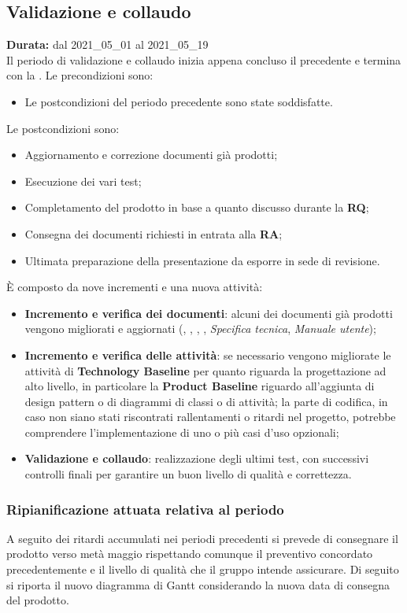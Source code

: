 \subsection{Validazione e collaudo}
\label{validazione_e_collaudo}
\textbf{Durata:} dal 2021\_05\_01 al 2021\_05\_19\\
Il periodo di validazione e collaudo inizia appena concluso il precedente e termina con la .
Le precondizioni sono:
\begin{itemize}
    \item Le postcondizioni del periodo precedente sono state soddisfatte.
\end{itemize}
Le postcondizioni sono:
\begin{itemize}
    \item Aggiornamento e correzione documenti già prodotti;
    \item Esecuzione dei vari test;
    \item Completamento del prodotto in base a quanto discusso durante la \textbf{RQ};
    \item Consegna dei documenti richiesti in entrata alla \textbf{RA};
    \item Ultimata preparazione della presentazione da esporre in sede di revisione.
\end{itemize}
È composto da nove incrementi e una nuova attività:
\begin{itemize}
    \item \textbf{Incremento e verifica dei documenti}: alcuni dei documenti già prodotti vengono migliorati e aggiornati ({\NdP}, {\PdP}, {\Glossario}, {\PdQ}, \textit{Specifica tecnica}, \textit{Manuale utente}); 
    \item \textbf{Incremento e verifica delle attività}: se necessario vengono migliorate le attività di \textbf{Technology Baseline} per quanto riguarda la progettazione ad alto livello, in particolare la \textbf{Product Baseline} riguardo all'aggiunta di design pattern o di diagrammi di classi o di attività; la parte di codifica, in caso non siano stati riscontrati rallentamenti o ritardi nel progetto, potrebbe comprendere l'implementazione di uno o più casi d'uso opzionali;
    \item \textbf{Validazione e collaudo}: realizzazione degli ultimi test, con successivi controlli finali per garantire un buon livello di qualità e correttezza.
\end{itemize}
\newpage
\subsubsection{Ripianificazione attuata relativa al periodo} \label{RipianificazioneValidazione}
A seguito dei ritardi accumulati nei periodi precedenti si prevede di consegnare il prodotto verso metà maggio rispettando comunque il preventivo concordato precedentemente e il livello di qualità che il gruppo intende assicurare. Di seguito si riporta il nuovo diagramma di Gantt considerando la nuova data di consegna del prodotto.
